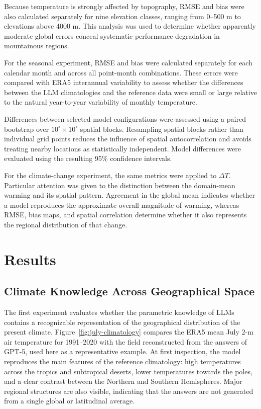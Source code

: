 Because temperature is strongly affected by topography, RMSE and bias were also calculated separately for nine elevation classes, ranging from 0--500 m to elevations above 4000 m. This analysis was used to determine whether apparently moderate global errors conceal systematic performance degradation in mountainous regions.

For the seasonal experiment, RMSE and bias were calculated separately for each calendar month and across all point-month combinations. These errors were compared with ERA5 interannual variability to assess whether the differences between the LLM climatologies and the reference data were small or large relative to the natural year-to-year variability of monthly temperature.

Differences between selected model configurations were assessed using a paired bootstrap over \(10^{\circ}\times10^{\circ}\) spatial blocks. Resampling spatial blocks rather than individual grid points reduces the influence of spatial autocorrelation and avoids treating nearby locations as statistically independent. Model differences were evaluated using the resulting 95\% confidence intervals.

For the climate-change experiment, the same metrics were applied to \(\Delta T\). Particular attention was given to the distinction between the domain-mean warming and its spatial pattern. Agreement in the global mean indicates whether a model reproduces the approximate overall magnitude of warming, whereas RMSE, bias maps, and spatial correlation determine whether it also represents the regional distribution of that change.

\section{Results}

\subsection{Climate Knowledge Across Geographical Space}

The first experiment evaluates whether the parametric knowledge of LLMs contains a recognizable representation of the geographical distribution of the present climate. Figure~\ref{fig:july-climatology} compares the ERA5 mean July 2-m air temperature for 1991--2020 with the field reconstructed from the answers of GPT-5, used here as a representative example. At first inspection, the model reproduces the main features of the reference climatology: high temperatures across the tropics and subtropical deserts, lower temperatures towards the poles, and a clear contrast between the Northern and Southern Hemispheres. Major regional structures are also visible, indicating that the answers are not generated from a single global or latitudinal average.

